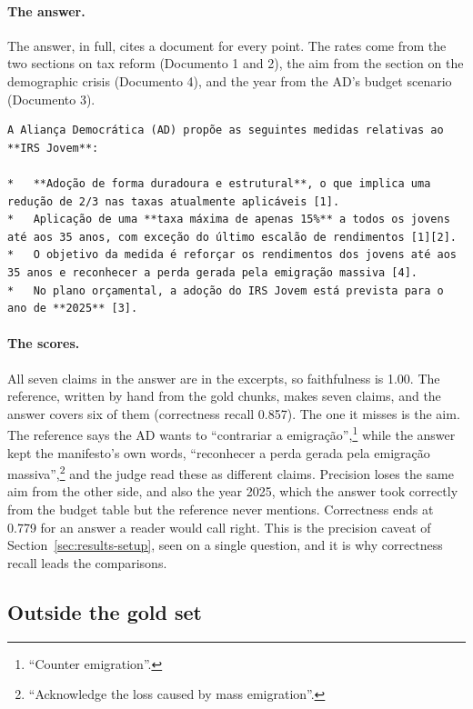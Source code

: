 \paragraph{The answer.} The answer, in full, cites a document for every
point. The rates come from the two sections on tax reform (Documento 1 and 2),
the aim from the section on the demographic crisis (Documento 4), and the
year from the AD's budget scenario (Documento 3).

\begin{Verbatim}[fontsize=\scriptsize, breaklines=true, frame=single]
A Aliança Democrática (AD) propõe as seguintes medidas relativas ao **IRS Jovem**:

*   **Adoção de forma duradoura e estrutural**, o que implica uma redução de 2/3 nas taxas atualmente aplicáveis [1].
*   Aplicação de uma **taxa máxima de apenas 15%** a todos os jovens até aos 35 anos, com exceção do último escalão de rendimentos [1][2].
*   O objetivo da medida é reforçar os rendimentos dos jovens até aos 35 anos e reconhecer a perda gerada pela emigração massiva [4].
*   No plano orçamental, a adoção do IRS Jovem está prevista para o ano de **2025** [3].
\end{Verbatim}

\paragraph{The scores.} All seven claims in the answer are in the excerpts,
so faithfulness is 1.00. The reference, written by hand from the gold chunks,
makes seven claims, and the answer covers six of them (correctness recall
0.857). The one it misses is the aim. The reference says the AD wants to
``contrariar a emigração'',\footnote{``Counter emigration''.} while the answer
kept the manifesto's own words, ``reconhecer a perda gerada pela emigração
massiva'',\footnote{``Acknowledge the loss caused by mass emigration''.} and the
judge read these as different claims. Precision loses the same aim from the
other side, and also the year 2025, which the answer took correctly from the
budget table but the reference never mentions. Correctness ends at 0.779 for
an answer a reader would call right. This is the precision caveat of
Section~\ref{sec:results-setup}, seen on a single question, and it is why
correctness recall leads the comparisons.

\subsection{Outside the gold set} \label{subsec:results-walkthrough}

